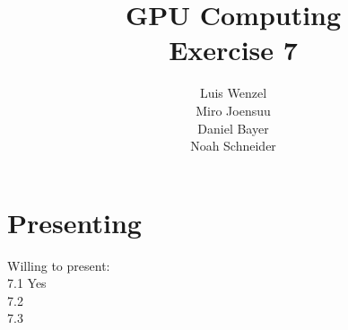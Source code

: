 \documentclass[12pt,twoside,a4paper]{article}
\title{GPU Computing\\
Exercise 7}
\author{
  Luis Wenzel\\
  Miro Joensuu\\
  Daniel Bayer\\
  Noah Schneider
}
\date{}
\begin{document}
\maketitle

\section{Presenting}
Willing to present:\\
7.1 Yes\\
7.2 \\
7.3 \\

\FloatBarrier
	
\FloatBarrier

\FloatBarrier
\end{document}
